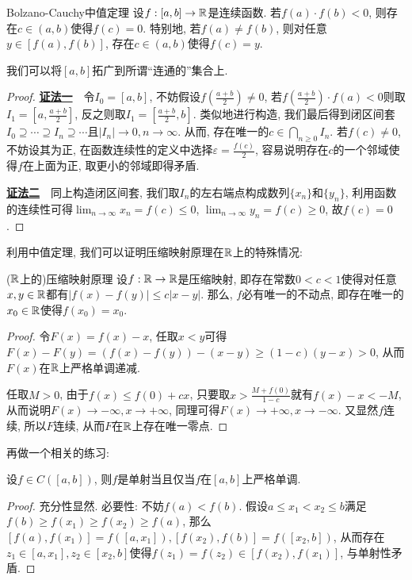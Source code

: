 \begin{theorem}{Bolzano-Cauchy中值定理}
	设$f:[a,b] \to \mathbb{R}$是连续函数. 若$f(a) \cdot f(b) <0$, 则存在$c \in (a,b)$使得$f(c)=0$. 特别地, 若$f(a) \neq f(b)$, 则对任意$y \in [f(a),f(b)]$, 存在$c \in (a,b)$使得$f(c)=y$. 
\end{theorem}
\begin{remark}
	我们可以将$[a,b]$拓广到所谓“连通的”集合上. 
\end{remark}
\begin{proof}
	\underline{\textbf{证法一}}~~令$I_0=[a,b]$, 不妨假设$f(\frac{a+b}{2}) \neq 0$, 若$f(\frac{a+b}{2}) \cdot f(a)<0$则取$I_1=[a,\frac{a+b}{2}]$, 反之则取$I_1=[\frac{a+b}{2},b]$. 类似地进行构造, 我们最后得到闭区间套$I_0 \supseteq \cdots \supseteq I_n \supseteq \cdots$且$|I_n|\to 0,n \to \infty$. 从而, 存在唯一的$c \in \bigcap_{n\geq 0}I_n$. 若$f(c) \neq 0$, 不妨设其为正, 在函数连续性的定义中选择$\varepsilon = \frac{f(c)}{2}$, 容易说明存在$c$的一个邻域使得$f$在上面为正, 取更小的邻域即得矛盾. 
	
	\underline{\textbf{证法二}}~~同上构造闭区间套, 我们取$I_n$的左右端点构成数列$\{ x_n \}$和$\{ y_n \}$, 利用函数的连续性可得$\lim_{n\to \infty} x_n = f(c) \leq 0$, $\lim_{n\to \infty} y_n = f(c) \geq 0$, 故$f(c)=0$. 
\end{proof}

利用中值定理, 我们可以证明压缩映射原理在$\mathbb{R}$上的特殊情况: 

\begin{proposition}{($\mathbb{R}$上的)压缩映射原理}
	设$f:\mathbb{R} \to \mathbb{R}$是压缩映射, 即存在常数$0 < c < 1$使得对任意$x,y \in \mathbb{R}$都有$|f(x)-f(y)| \leq c|x-y|$. 那么, $f$必有唯一的不动点, 即存在唯一的$x_0 \in \mathbb{R}$使得$f(x_0)=x_0$. 
\end{proposition}
\begin{proof}
	令$F(x) = f(x) - x$, 任取$x<y$可得$F(x)-F(y) = (f(x)-f(y)) - (x-y) \geq (1-c)(y-x) >0$, 从而$F(x)$在$\mathbb{R}$上严格单调递减. 
	
	任取$M>0$, 由于$f(x) \leq f(0)+cx$, 只要取$x > \frac{M+f(0)}{1-c}$就有$f(x)-x<-M$, 从而说明$F(x) \to -\infty ,x \to +\infty$, 同理可得$F(x) \to +\infty ,x \to -\infty$. 又显然$f$连续, 所以$F$连续, 从而$F$在$\mathbb{R}$上存在唯一零点. 
\end{proof}

再做一个相关的练习: 

\begin{proposition}{}
	设$f \in C([a,b])$, 则$f$是单射当且仅当$f$在$[a,b]$上严格单调. 
\end{proposition}
\begin{proof}
	充分性显然. 必要性: 不妨$f(a)<f(b)$. 假设$a \leq x_1 < x_2 \leq b$满足$f(b) \geq f(x_1) \geq f(x_2) \geq f(a)$, 那么$[f(a),f(x_1)] = f([a,x_1]), [f(x_2),f(b)] = f([x_2,b])$, 从而存在$z_1 \in [a,x_1],z_2 \in [x_2,b]$使得$f(z_1)=f(z_2) \in [f(x_2),f(x_1)]$, 与单射性矛盾. 
\end{proof}

